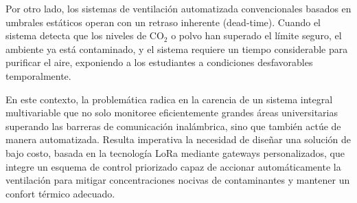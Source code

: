 Por otro lado, los sistemas de ventilación automatizada convencionales basados en umbrales estáticos operan con un retraso inherente (dead-time). Cuando el sistema detecta que los niveles de CO\(_2\) o polvo han superado el límite seguro, el ambiente ya está contaminado, y el sistema requiere un tiempo considerable para purificar el aire, exponiendo a los estudiantes a condiciones desfavorables temporalmente.

En este contexto, la problemática radica en la carencia de un sistema integral multivariable que no solo monitoree eficientemente grandes áreas universitarias superando las barreras de comunicación inalámbrica, sino que también actúe de manera automatizada. Resulta imperativa la necesidad de diseñar una solución de bajo costo, basada en la tecnología LoRa mediante gateways personalizados, que integre un esquema de control priorizado capaz de accionar automáticamente la ventilación para mitigar concentraciones nocivas de contaminantes y mantener un confort térmico adecuado.










